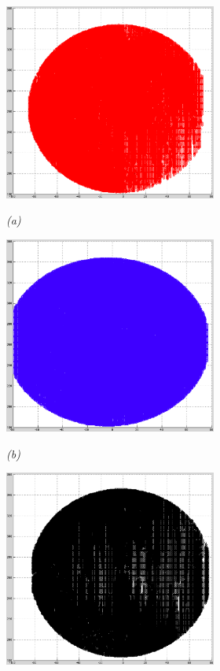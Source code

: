 \begin{figure}[htb]
  \begin{minipage}[t]{2.75in}
    \centering
    \centerline{\mbox{\includegraphics[width=2.75in]{data_extraction/images/surface_plane/superior_inside/xy.eps}}}
    \centerline{\emph{(a)}}
  \end{minipage}\medskip
  \begin{minipage}[t]{2.75in}
    \centering
    \centerline{\mbox{\includegraphics[width=2.75in]{data_extraction/images/surface_plane/superior_outside/xy.eps}}}
    \centerline{\emph{(b)}}
  \end{minipage}
  \begin{minipage}[t]{2.75in}
    \centering
    \centerline{\mbox{\includegraphics[width=2.75in]{data_extraction/images/surface_plane/inferior_inside/xy.eps}}}

\end{minipage}
\end{figure}
